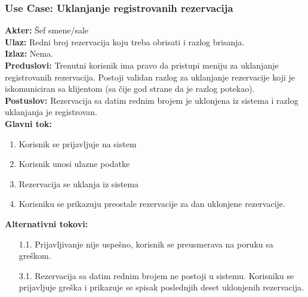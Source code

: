 \documentclass{article}
\begin{document}
\subsubsection{\textbf{Use Case}: Uklanjanje registrovanih rezervacija}
\textbf{Akter:} Šef smene/sale\\
\textbf{Ulaz:} Redni broj rezervacija koju treba obrisati i razlog brisanja.\\
\textbf{Izlaz:} Nema.\\
\textbf{Preduslovi:} Trenutni korisnik ima pravo da pristupi meniju za uklanjanje registrovanih rezervacija. Postoji validan razlog za uklanjanje rezervacije koji je iskomuniciran sa klijentom (sa čije god strane da je razlog potekao).\\
\textbf{Postuslov:} Rezervacija sa datim rednim brojem je uklonjena iz sistema i razlog uklanjanja je registrovan.\\
\textbf{Glavni tok:}
\begin{enumerate}
\item Korisnik se prijavljuje na sistem
\item Korisnik unosi ulazne podatke
\item Rezervacija se uklanja iz sistema
\item Korisniku se prikazuju preostale rezervacije za dan uklonjene rezervacije.\\
\end{enumerate}
\textbf{Alternativni tokovi:}\\
\begin{itemize}
\item [1.1.] Prijavljivanje nije uspešno, korisnik se preusmerava na poruku sa greškom.
\item [3.1.] Rezervacija sa datim rednim brojem ne postoji u sistemu. Korisniku se prijavljuje greška i prikazuje se spisak poslednjih deset uklonjenih rezervacija.
\end{itemize}
\end{document}
